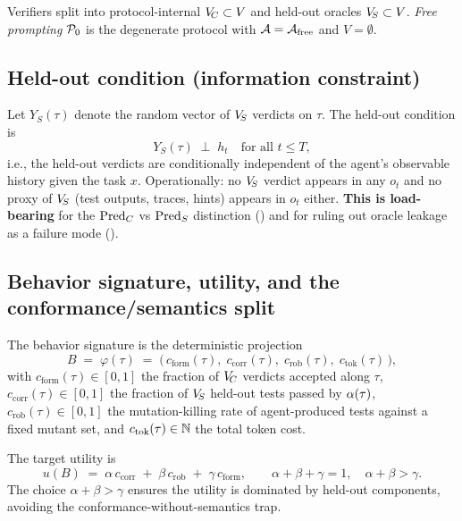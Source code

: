 Verifiers split into protocol-internal $V_{\!C} \subset V$ and held-out oracles $V_{\!S} \subset V$. \emph{Free prompting} $\mathcal{P}_0$ is the degenerate protocol with $\mathcal{A} = \mathcal{A}_{\mathrm{free}}$ and $V = \emptyset$.

\subsection{Held-out condition (information constraint)}

Let $Y_S(\tau)$ denote the random vector of $V_{\!S}$ verdicts on $\tau$. The held-out condition is
\begin{equation}
  Y_S(\tau) \;\perp\; h_t \quad \text{for all } t \le T,
  \label{eq:holdout-condition}
\end{equation}
i.e., the held-out verdicts are conditionally independent of the agent's observable history given the task $x$. Operationally: no $V_{\!S}$ verdict appears in any $o_t$ and no proxy of $V_{\!S}$ (test outputs, traces, hints) appears in $o_t$ either. \textbf{This is load-bearing} for the $\mathrm{Pred}_C$ vs $\mathrm{Pred}_S$ distinction () and for ruling out oracle leakage as a failure mode ().

\subsection{Behavior signature, utility, and the conformance/semantics split}

The behavior signature is the deterministic projection
\begin{equation}
  B \;=\; \varphi(\tau) \;=\; \big(\, c_{\mathrm{form}}(\tau),\; c_{\mathrm{corr}}(\tau),\; c_{\mathrm{rob}}(\tau),\; c_{\mathrm{tok}}(\tau)\, \big),
  \label{eq:behavior-signature}
\end{equation}
with $c_{\mathrm{form}}(\tau) \in [0,1]$ the fraction of $V_{\!C}$ verdicts accepted along $\tau$, $c_{\mathrm{corr}}(\tau) \in [0,1]$ the fraction of $V_{\!S}$ held-out tests passed by $\alpha(\tau)$, $c_{\mathrm{rob}}(\tau) \in [0,1]$ the mutation-killing rate of agent-produced tests against a fixed mutant set, and $c_{\mathrm{tok}}(\tau) \in \mathbb{N}$ the total token cost.

The target utility is
\begin{equation}
  u(B) \;=\; \alpha\, c_{\mathrm{corr}} \;+\; \beta\, c_{\mathrm{rob}} \;+\; \gamma\, c_{\mathrm{form}}, \qquad \alpha + \beta + \gamma = 1, \quad \alpha + \beta > \gamma.
  \label{eq:utility}
\end{equation}
The choice $\alpha + \beta > \gamma$ ensures the utility is dominated by held-out components, avoiding the conformance-without-semantics trap.

